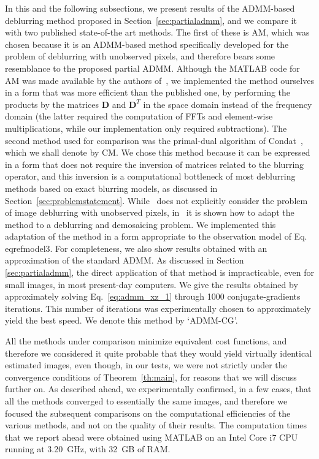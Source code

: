 \documentclass[10pt,twocolumn,twoside]{IEEEtran}
\newcommand{\D}{\mathbf{D}} %
\begin{document}
In this and the following subsections, we present results of the ADMM-based deblurring method proposed in Section~\ref{sec:partialadmm}, and we compare it with two published state-of-the art methods. The first of these is AM, which was chosen because it is an ADMM-based method specifically developed for the problem of deblurring with unobserved pixels, and therefore bears some resemblance to the proposed partial ADMM. Although the MATLAB code for AM was made available by the authors of~\cite{Almeida2013a}, we implemented the method ourselves in a form that was more efficient than the published one, by performing the products by the matrices $\D$ and $\D^T$ in the space domain instead of the frequency domain (the latter required the computation of FFTs and element-wise multiplications, while our implementation only required subtractions). The second method used for comparison was the primal-dual algorithm of Condat~\cite{Condat2013}, which we shall denote by CM. We chose this method because it can be expressed in a form that does not require the inversion of matrices related to the blurring operator, and this inversion is a computational bottleneck of most deblurring methods based on exact blurring models, as discussed in Section~\mbox{\ref{sec:problemstatement}}. While~\cite{Condat2013} does not explicitly consider the problem of image deblurring with unobserved pixels, in~\cite{Condat2014} it is shown how to adapt the method to a deblurring and demosaicing problem. We implemented this adaptation of the method in a form appropriate to the observation model of Eq.\\eqref{model3}. For completeness, we also show results obtained with an approximation of the standard ADMM. As discussed in Section \ref{sec:partialadmm}, the direct application of that method is impracticable, even for small images, in most present-day computers. We give the results obtained by approximately solving Eq.~\eqref{eq:admm_xz_1} through 1000 conjugate-gradients iterations. This number of iterations was experimentally chosen to approximately yield the best speed. We denote this method by `ADMM-CG'.

All the methods under comparison minimize equivalent cost functions, and therefore we considered it quite probable that they would yield virtually identical estimated images, even though, in our tests, we were not strictly under the convergence conditions of Theorem~\ref{th:main}, for reasons that we will discuss further on. As described ahead, we experimentally confirmed, in a few cases, that all the methods converged to essentially the same images, and therefore we focused the subsequent comparisons on the computational efficiencies of the various methods, and not on the quality of their results. The computation times that we report ahead were obtained using MATLAB on an Intel Core i7 CPU running at 3.20~GHz, with 32~GB of RAM.
\end{document}
